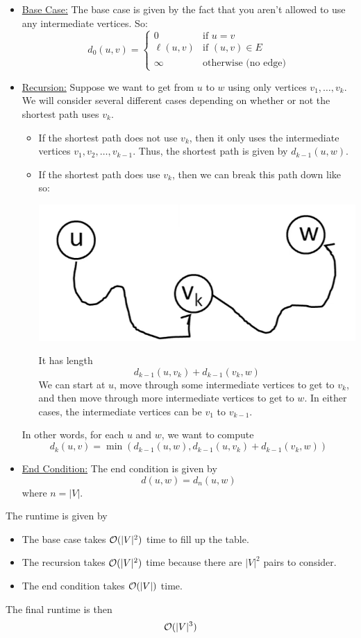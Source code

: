 \documentclass[letterpaper]{article}
\begin{document}
\begin{itemize}
    \item \underline{Base Case:} The base case is given by the fact that you aren't allowed to use any intermediate vertices. So: 
    \[d_{0}(u, v) = \begin{cases}
        0 & \text{if } u = v \\ 
        \ell(u, v) & \text{if } (u, v) \in E \\ 
        \infty & \text{otherwise (no edge)} 
    \end{cases}\]

    \item \underline{Recursion:} Suppose we want to get from $u$ to $w$ using only vertices $v_1, \dots, v_k$. We will consider several different cases depending on whether or not the shortest path uses $v_k$.
    \begin{itemize}
        \item If the shortest path does not use $v_k$, then it only uses the intermediate vertices $v_1, v_2, \dots, v_{k - 1}$. Thus, the shortest path is given by $d_{k - 1}(u, w)$. 
        \item If the shortest path does use $v_k$, then we can break this path down like so: 
        \begin{center}
            \includegraphics[scale=0.5]{assets/sp3.png}
        \end{center}
        It has length 
        \[d_{k - 1}(u, v_k) + d_{k - 1}(v_k, w)\]
        We can start at $u$, move through some intermediate vertices to get to $v_k$, and then move through more intermediate vertices to get to $w$. In either cases, the intermediate vertices can be $v_1$ to $v_{k - 1}$. 
    \end{itemize}
    In other words, for each $u$ and $w$, we want to compute 
    \[d_{k}(u, v) = \min(d_{k - 1}(u, w), d_{k - 1}(u, v_k) + d_{k - 1}(v_k, w))\]

    \item \underline{End Condition:} The end condition is given by 
    \[d(u, w) = d_{n}(u, w)\]
    where $n = |V|$. 
\end{itemize}
The runtime is given by 
\begin{itemize}
    \item The base case takes $\mathcal{O}(|V|^2)$ time to fill up the table. 
    \item The recursion takes $\mathcal{O}(|V|^2)$ time because there are $|V|^2$ pairs to consider.
    \item The end condition takes $\mathcal{O}(|V|)$ time. 
\end{itemize}
The final runtime is then 
\[\mathcal{O}(|V|^3)\]
\end{document}
